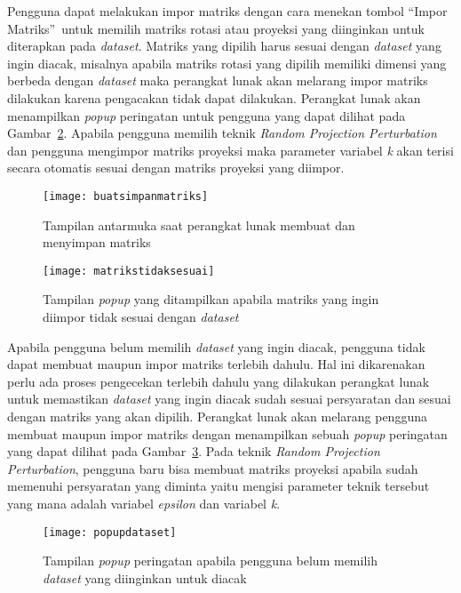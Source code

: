 Pengguna dapat melakukan impor matriks dengan cara menekan tombol \textquotedblleft Impor Matriks\textquotedblright~untuk memilih matriks rotasi atau proyeksi yang diinginkan untuk diterapkan pada \textit{dataset}. Matriks yang dipilih harus sesuai dengan \textit{dataset} yang ingin diacak, misalnya apabila matriks rotasi yang dipilih memiliki dimensi yang berbeda dengan \textit{dataset} maka perangkat lunak akan melarang impor matriks dilakukan karena pengacakan tidak dapat dilakukan. Perangkat lunak akan menampilkan \textit{popup} peringatan untuk pengguna yang dapat dilihat pada Gambar~\ref{fig:matrikstidaksesuai}. Apabila pengguna memilih teknik \textit{Random Projection Perturbation} dan pengguna mengimpor matriks proyeksi maka parameter variabel \textit{k} akan terisi secara otomatis sesuai dengan matriks proyeksi yang diimpor.

\begin{figure}
	\centering
	\texttt{[image: buatsimpanmatriks]}
	\caption{Tampilan antarmuka saat perangkat lunak membuat dan menyimpan matriks}
	\label{fig:buatsimpanmatriks}
\end{figure}

\begin{figure}
	\centering
	\texttt{[image: matrikstidaksesuai]}
	\caption{Tampilan \textit{popup} yang ditampilkan apabila matriks yang ingin diimpor tidak sesuai dengan \textit{dataset}}
	\label{fig:matrikstidaksesuai}
\end{figure}

Apabila pengguna belum memilih \textit{dataset} yang ingin diacak, pengguna tidak dapat membuat maupun impor matriks terlebih dahulu. Hal ini dikarenakan perlu ada proses pengecekan terlebih dahulu yang dilakukan perangkat lunak untuk memastikan \textit{dataset} yang ingin diacak sudah sesuai persyaratan dan sesuai dengan matriks yang akan dipilih. Perangkat lunak akan melarang pengguna membuat maupun impor matriks dengan menampilkan sebuah \textit{popup} peringatan yang dapat dilihat pada Gambar~\ref{fig:popupdataset}. Pada teknik \textit{Random Projection Perturbation}, pengguna baru bisa membuat matriks proyeksi apabila sudah memenuhi persyaratan yang diminta yaitu mengisi parameter teknik tersebut yang mana adalah variabel \textit{epsilon} dan variabel \textit{k}.

\begin{figure}
	\centering
	\texttt{[image: popupdataset]}
	\caption{Tampilan \textit{popup} peringatan apabila pengguna belum memilih \textit{dataset} yang diinginkan untuk diacak}
	\label{fig:popupdataset}
\end{figure}

